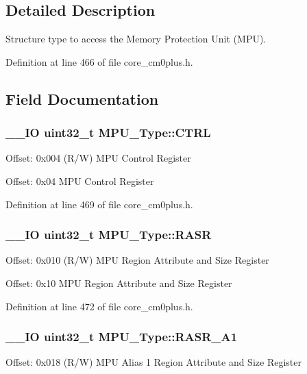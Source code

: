 \subsection{Detailed Description}
Structure type to access the Memory Protection Unit (M\-P\-U). 

Definition at line 466 of file core\-\_\-cm0plus.\-h.



\subsection{Field Documentation}
\hypertarget{struct_m_p_u___type_aab33593671948b93b1c0908d78779328}{
\subsubsection[{C\-T\-R\-L}]{\setlength{\rightskip}{0pt plus 5cm}\-\_\-\-\_\-\-I\-O {\bf uint32\-\_\-t} M\-P\-U\-\_\-\-Type\-::\-C\-T\-R\-L}}\label{struct_m_p_u___type_aab33593671948b93b1c0908d78779328}
Offset\-: 0x004 (R/\-W) M\-P\-U Control Register

Offset\-: 0x04 M\-P\-U Control Register 

Definition at line 469 of file core\-\_\-cm0plus.\-h.

\hypertarget{struct_m_p_u___type_adc65d266d15ce9ba57b3d127e8267f03}{
\subsubsection[{R\-A\-S\-R}]{\setlength{\rightskip}{0pt plus 5cm}\-\_\-\-\_\-\-I\-O {\bf uint32\-\_\-t} M\-P\-U\-\_\-\-Type\-::\-R\-A\-S\-R}}\label{struct_m_p_u___type_adc65d266d15ce9ba57b3d127e8267f03}
Offset\-: 0x010 (R/\-W) M\-P\-U Region Attribute and Size Register

Offset\-: 0x10 M\-P\-U Region Attribute and Size Register 

Definition at line 472 of file core\-\_\-cm0plus.\-h.

\hypertarget{struct_m_p_u___type_a94222f9a8637b5329016e18f08af7185}{
\subsubsection[{R\-A\-S\-R\-\_\-\-A1}]{\setlength{\rightskip}{0pt plus 5cm}\-\_\-\-\_\-\-I\-O {\bf uint32\-\_\-t} M\-P\-U\-\_\-\-Type\-::\-R\-A\-S\-R\-\_\-\-A1}}\label{struct_m_p_u___type_a94222f9a8637b5329016e18f08af7185}
Offset\-: 0x018 (R/\-W) M\-P\-U Alias 1 Region Attribute and Size Register

